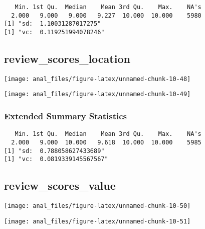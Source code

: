 \begin{verbatim}   Min. 1st Qu.  Median    Mean 3rd Qu.    Max.    NA's 
  2.000   9.000   9.000   9.227  10.000  10.000    5980 
[1] "sd:  1.10031287017275"
[1] "vc:  0.119251994078246"
\end{verbatim}

\pagebreak

\centering

\hypertarget{review_scores_location}{%
\subsection{review\_scores\_location}\label{review_scores_location}}

\begin{center}\texttt{[image: anal\_files/figure-latex/unnamed-chunk-10-48]} \end{center}

\begin{center}\texttt{[image: anal\_files/figure-latex/unnamed-chunk-10-49]} \end{center}

\hypertarget{extended-summary-statistics-17}{%
\subsubsection{Extended Summary
Statistics}\label{extended-summary-statistics-17}}

\begin{verbatim}   Min. 1st Qu.  Median    Mean 3rd Qu.    Max.    NA's 
  2.000   9.000  10.000   9.618  10.000  10.000    5985 
[1] "sd:  0.788058627433689"
[1] "vc:  0.0819339145567567"
\end{verbatim}

\pagebreak

\centering

\hypertarget{review_scores_value}{%
\subsection{review\_scores\_value}\label{review_scores_value}}

\begin{center}\texttt{[image: anal\_files/figure-latex/unnamed-chunk-10-50]} \end{center}

\begin{center}\texttt{[image: anal\_files/figure-latex/unnamed-chunk-10-51]} \end{center}

